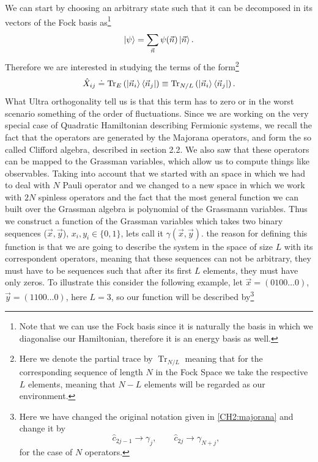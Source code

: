 \indent We can start by choosing an arbitrary state such that it can be decomposed in its vectors of the Fock basis as\footnote{Note that we can use the Fock basis since it is naturally the basis in which we diagonalise our Hamiltonian, therefore it is an energy basis as well.}
\begin{equation}
\mathinner{|{\psi}\rangle} = \sum_{\vec{n}}\psi(\vec{n})\mathinner{|{\vec{n}}\rangle}.
\end{equation}
Therefore we are interested in studying the terms of the form\footnote{Here we denote the partial trace by $\operatorname{Tr}_{N/L}$ meaning that for the corresponding sequence of length $N$ in the Fock Space we take the respective $L$ elements, meaning that $N-L$ elements will be regarded as our environment.}
\begin{equation}
\hat{X}_{ij} \doteq \operatorname{Tr}_{E}\left(\mathinner{|{\vec{n}_i}\rangle}\mathinner{\langle{\vec{n}_j}|}\right) \equiv \operatorname{Tr}_{N/L}\left(\mathinner{|{\vec{n}_i}\rangle}\mathinner{\langle{\vec{n}_j}|}\right).
\end{equation}
What Ultra orthogonality tell us is that this term has to zero or in the worst scenario something of the order of fluctuations. Since we are working on the very special case of Quadratic Hamiltonian describing Fermionic systems, we recall the fact that the operators are generated by the Majorana operators, and form the so called Clifford algebra, described in section 2.2. We also saw that these operators can be mapped to the Grassman variables, which allow us to compute things like observables. Taking into account that we started with an space in which we had to deal with $N$ Pauli operator and we changed to a new space in which we work with $2N$ spinless operators and the fact that the most general  function we can built over the Grassman algebra is polynomial of the Grassmann variables. Thus we construct a function of the Grassman variables which takes two binary sequences ($\vec{x},\vec{y}$), $x_i,y_i \in \{0,1\}$, lets call it $\gamma(\vec{x},\vec{y})$. the reason for defining this function is that we are going to describe the system in the space of size $L$ with its correspondent operators, meaning that these sequences can not be arbitrary, they must have to be sequences such that after its first $L$ elements, they must have only zeros. To illustrate this consider the following example, let $\vec{x}=(0100\ldots 0)$, $\vec{y}=(1100\ldots 0)$, here $L=3$, so our function will be described by\footnote{Here we have changed the original notation given in \eqref{CH2:majorana} and change it by 
\begin{equation}
\hat{c}_{2j-1}\rightarrow \gamma_{j} , \qquad \hat{c}_{2j}\rightarrow \gamma_{N+j},
\end{equation}
for the case of $N$ operators.
}
